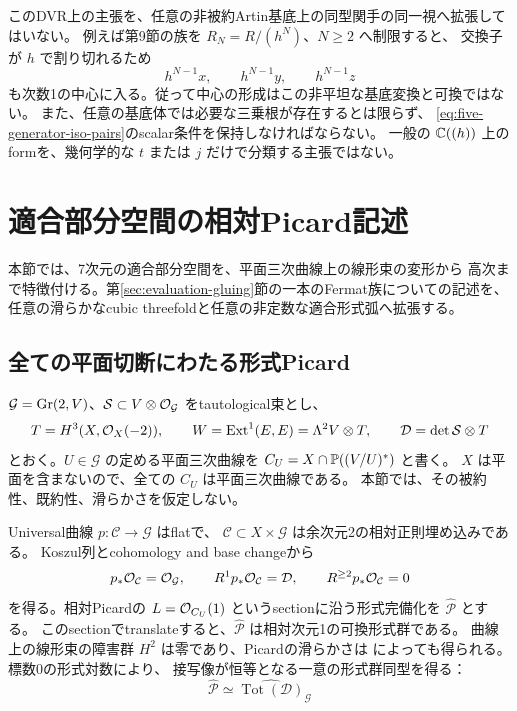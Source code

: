 このDVR上の主張を、任意の非被約Artin基底上の同型関手の同一視へ拡張してはいない。
例えば第9節の族を $R_N=R/(h^N)$、$N\ge2$ へ制限すると、
交換子が $h$ で割り切れるため
\[
 h^{N-1}x,\qquad h^{N-1}y,\qquad h^{N-1}z
\]
も次数1の中心に入る。従って中心の形成はこの非平坦な基底変換と可換ではない。
また、任意の基底体では必要な三乗根が存在するとは限らず、
\eqref{eq:five-generator-iso-pairs}のscalar条件を保持しなければならない。
一般の $\mathbb C((h))$ 上のformを、幾何学的な $t$ または $j$ だけで分類する主張ではない。

\section{適合部分空間の相対Picard記述}\label{sec:picard-compatibility}

本節では、7次元の適合部分空間を、平面三次曲線上の線形束の変形から
高次まで特徴付ける。第\ref{sec:evaluation-gluing}節の一本のFermat族についての記述を、
任意の滑らかなcubic threefoldと任意の非定数な適合形式弧へ拡張する。

\subsection{全ての平面切断にわたる形式Picard}

$\mathcal G=\operatorname{Gr}(2,V)$、$\mathcal S\subset V\otimes\mathcal O_{\mathcal G}$ をtautological束とし、
\[
 T=H^3(X,\mathcal O_X(-2)),\qquad
 W=\operatorname{Ext}^1(E,E)=\Lambda^2V\otimes T,\qquad
 \mathcal D=\det\mathcal S\otimes T
\]
とおく。$U\in\mathcal G$ の定める平面三次曲線を
$C_U=X\cap\mathbb P((V/U)^*)$ と書く。
$X$ は平面を含まないので、全ての $C_U$ は平面三次曲線である。
本節では、その被約性、既約性、滑らかさを仮定しない。

Universal曲線 $p:\mathcal C\to\mathcal G$ はflatで、
$\mathcal C\subset X\times\mathcal G$ は余次元2の相対正則埋め込みである。
Koszul列とcohomology and base changeから
\[
 p_*\mathcal O_{\mathcal C}=\mathcal O_{\mathcal G},\qquad
 R^1p_*\mathcal O_{\mathcal C}=\mathcal D,\qquad
 R^{\ge2}p_*\mathcal O_{\mathcal C}=0
\]
を得る。相対Picardの $L=\mathcal O_{C_U}(1)$ というsectionに沿う形式完備化を
$\widehat{\mathcal P}$ とする。
このsectionでtranslateすると、$\widehat{\mathcal P}$ は相対次元1の可換形式群である。
曲線上の線形束の障害群 $H^2$ は零であり、Picardの滑らかさは
\cite[Tag 0DPJ]{StacksPicardSmooth}によっても得られる。
標数0の形式対数\cite[Appendix A.2, Proposition A.2.2]{PicardFormal}により、
接写像が恒等となる一意の形式群同型を得る：
\begin{equation}\label{eq:relative-picard-log}
 \widehat{\mathcal P}
 \simeq\widehat{\operatorname{Tot}(\mathcal D)}_{\mathcal G}
\end{equation}

